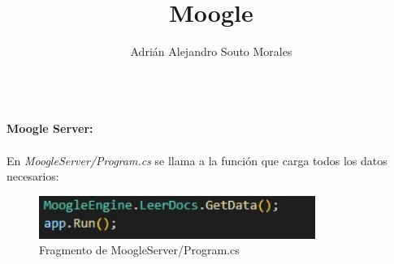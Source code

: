 \documentclass[10pt, letterpaper]{article}
\title{Moogle}
\author{Adrián Alejandro Souto Morales}
\begin{document}
    \maketitle
    \newpage
    \textbf{
            \\\large{Moogle Server:}\\
            \\
    }
    En \textit{MoogleServer/Program.cs} se llama a la función que carga todos los datos necesarios:
    \\

    \begin{figure}[h]
        \centering
        \includegraphics[width = 9cm]{img/MoogleServer.jpg}
        \caption[]{Fragmento de MoogleServer/Program.cs}
    \end{figure}
\end{document}
